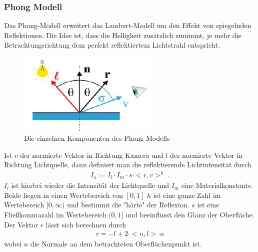    
\subsubsection{Phong Modell}
Das Phong-Modell erweitert das  Lambert-Modell um den Effekt von spiegelnden Reflektionen. Die Idee ist, dass die Helligkeit zusätzlich zunimmt, je mehr die Betrachtungsrichtung dem perfekt reflektiertem Lichtstrahl entspricht.  

\begin{figure}[H]
    \centering
    \includegraphics[width=0.6\textwidth]{images/phong_directions.jpg}
    \caption{Die einzelnen Komponenten des Phong-Modells}
    \label{fig:phong-directions}
\end{figure}

Ist $v$ der normierte Vektor in Richtung Kamera und $l$ der normierte Vektor in Richtung Lichtquelle, dann definiert man die  reflektierende Lichtintensität durch
\begin{align}
I_s := I_l \cdot I_m \cdot s \cdot <r,v>^h \;.
\end{align}
$I_l$ ist hierbei wieder die Intensität der Lichtquelle und $I_m$ eine Materialkonstante. Beide liegen in einen Wertebereich von $[0,1]$ 
$h$ ist eine ganze Zahl im Wertebereich $[0, \infty)$ und bestimmt die "härte" der Reflexion. $s$ ist eine Fließkommazahl im Wertebereich $(0,1]$ und beeinflusst den Glanz der Oberfläche.
 Der Vektor $r$ lässt sich berechnen durch 
\begin{align}
r = -l + 2 \cdot <n, l> \cdot n
\end{align}
wobei $n$ die Normale an dem betrachteten Oberflächenpunkt ist.

